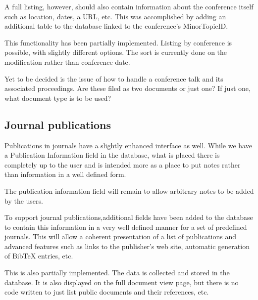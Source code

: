 \documentclass[12pt]{article}
\begin{document}
A full listing, however, should also contain information about the conference
itself such as location, dates, a URL, etc. This was accomplished by adding
an additional table to the database linked to the conference's MinorTopicID.

This functionality has been partially implemented. Listing by conference is
possible, with slightly different options. The sort is currently done on the
modification rather than conference date. 

Yet to be decided is the issue of how to handle a conference talk and its
associated proceedings. Are these filed as two documents or just one? If just
one, what document type is to be used?

\subsection{Journal publications}

Publications in journals have a slightly enhanced interface as well.
While we have a Publication Information field in the database, what is
placed there is completely up to the user and is intended more as a place to put
notes rather than information in a well defined form. 

The publication information field will remain to allow arbitrary notes to be
added by the users.

To support journal publications,additional fields have been added to
the database to contain this information in a very well defined manner
for a set of predefined journals. This will allow a coherent presentation of a
list of publications and advanced features such as links to the publisher's web
site, automatic generation of BibTeX entries, etc.

This is also partially implemented. The data is collected and stored in the
database. It is also displayed on the full document view page, but there is no
code written to just list public documents and their references, etc.


                                                                                      
\end{document}
